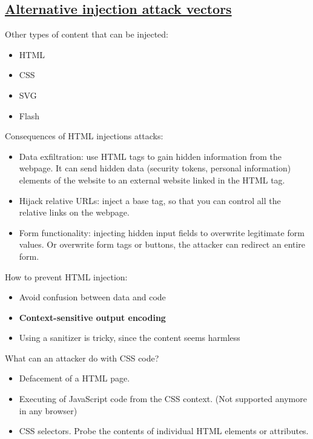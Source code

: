 \documentclass[titlepage]{article}
\begin{document}
    \subsection{\href{https://youtu.be/V05BMbqDt4Q}{Alternative injection attack vectors}}
    Other types of content that can be injected:
    \begin{itemize}
        \item HTML
        \item CSS
        \item SVG
        \item Flash
    \end{itemize}
    Consequences of HTML injections attacks:
    \begin{itemize}
        \item Data exfiltration: use HTML tags to gain hidden information from the webpage. It can send hidden data (security tokens, personal information) elements of the website to an external website linked in the HTML tag.
        \item Hijack relative URLs: inject a base tag, so that you can control all the relative links on the webpage.
        \item Form functionality: injecting hidden input fields to overwrite legitimate form values. Or overwrite form tags or buttons, the attacker can redirect an entire form.
    \end{itemize}
    How to prevent HTML injection:
    \begin{itemize}
        \item Avoid confusion between data and code
        \item \textbf{Context-sensitive output encoding}
        \item Using a sanitizer is tricky, since the content seems harmless
    \end{itemize}
    What can an attacker do with CSS code?
    \begin{itemize}
        \item Defacement of a HTML page.
        \item Executing of JavaScript code from the CSS context. (Not supported anymore in any browser)
        \item CSS selectors. Probe the contents of individual HTML elements or attributes.  
    \end{itemize}
\end{document}
